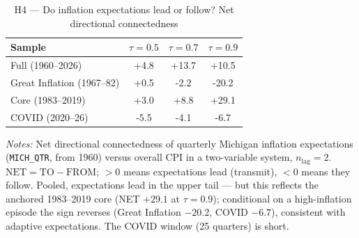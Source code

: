 \begin{table}[!ht]
\centering
\caption{H4 --- Do inflation expectations lead or follow? Net directional connectedness}
\label{tab:h6net}
\setlength{\tabcolsep}{6pt}\footnotesize
\begin{threeparttable}
\begin{tabular}{l c c c}
\toprule
Sample & $\tau=0.5$ & $\tau=0.7$ & $\tau=0.9$ \\
\midrule
Full (1960--2026) & +4.8 & +13.7 & +10.5 \\
Great Inflation (1967--82) & +0.5 & -2.2 & -20.2 \\
Core (1983--2019) & +3.0 & +8.8 & +29.1 \\
COVID (2020--26) & -5.5 & -4.1 & -6.7 \\
\bottomrule
\end{tabular}
\begin{tablenotes}[flushleft]\footnotesize
\item \textit{Notes:} Net directional connectedness of quarterly Michigan inflation expectations (\texttt{MICH\_QTR}, from 1960) versus overall CPI in a two-variable system, $n_{\text{lag}}=2$. $\text{NET}=\text{TO}-\text{FROM}$; $>0$ means expectations lead (transmit), $<0$ means they follow. Pooled, expectations lead in the upper tail --- but this reflects the anchored 1983--2019 core (NET $+29.1$ at $\tau=0.9$); conditional on a high-inflation episode the sign reverses (Great Inflation $-20.2$, COVID $-6.7$), consistent with adaptive expectations. The COVID window (25 quarters) is short.
\end{tablenotes}
\end{threeparttable}
\end{table}

